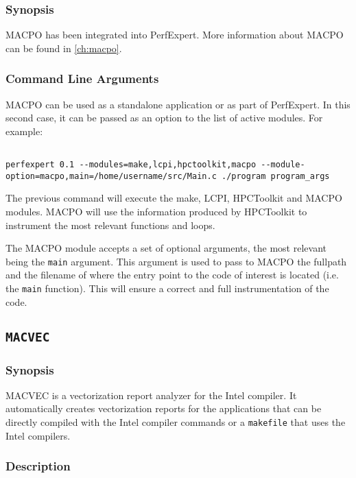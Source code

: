 \subsubsection{Synopsis}

MACPO has been integrated into PerfExpert. More information about MACPO can be found in \ref{ch:macpo}. 

\subsubsection{Command Line Arguments}

MACPO can be used as a standalone application or as part of PerfExpert. In this second case, 
it can be passed as an option to the list of active modules. For example:

\begin{lstlisting}[breaklines]

perfexpert 0.1 --modules=make,lcpi,hpctoolkit,macpo --module-option=macpo,main=/home/username/src/Main.c ./program program_args

\end{lstlisting}

The previous command will execute the make, LCPI, HPCToolkit and MACPO modules. MACPO will use the information
produced by HPCToolkit to instrument the most relevant functions and loops.

The MACPO module accepts a set of optional arguments, the most relevant being the \texttt{main} argument. This
argument is used to pass to MACPO the fullpath and the filename of where the entry point to the code of interest
is located (i.e. the \texttt{main} function). This will ensure a correct and full instrumentation of the code.

\subsection{\texttt{MACVEC}}


\subsubsection{Synopsis}

MACVEC is a vectorization report analyzer for the Intel compiler. It automatically creates vectorization reports
for the applications that can be directly compiled with the Intel compiler commands or a \texttt{makefile} that uses
the Intel compilers.

\subsubsection{Description}


